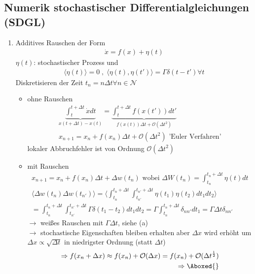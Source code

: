 \documentclass[12pt]{article}
\begin{document}
\subsection*{Numerik stochastischer Differentialgleichungen (SDGL)}
\begin{enumerate}
\item Additives Rauschen der Form 
\begin{align}
\dot{x}	= f(x) + \eta (t)
\end{align}
$\eta (t)$: stochastischer Prozess und
\begin{align}
\langle \eta (t) \rangle = 0 \; , \; \langle \eta (t), \eta (t') \rangle = \Gamma \delta (t-t') \forall t
\end{align}
Diskretisieren der Zeit $t_n = n \Delta t \forall n \in \mathcal{N}$
\begin{itemize}
\item ohne Rauschen 
\begin{align}
\underbrace{\int_t^{t+\Delta t} \dot{x} dt}_\text{$x(t+ \Delta t) - x(t)$} = \underbrace{\int_t ^{t+\Delta t} f(x(t')) dt'}_\text{$f(x(t)) \Delta t + \mathcal{O}(\Delta t^2)$} \\
x_{n+1} = x_n + f(x_n) \Delta t + \mathcal{O} (\Delta t^2) \mbox{ 'Euler Verfahren'}
\end{align}
lokaler Abbruchfehler ist von Ordnung $\mathcal{O} (\Delta t^2)$
\item mit Rauschen 
\begin{align}
x_{n+1} = x_n + f(x_n) \Delta t + \Delta w(t_n) \mbox{ wobei } \Delta W(t_n) = \int_{t_n}^{t_n + \Delta t} \eta (t) dt \\
\langle \Delta w(t_n) \Delta w(t_{n'}) \rangle = \langle \int_{t_n}^{t_n +\Delta t } \int_{t_{n'}}^{t_{n'} +\Delta t } \eta (t_1) \eta (t_2) dt_1 dt_2 \rangle \\
= \int_{t_n}^{t_n +\Delta t } \int_{t_{n'}}^{t_{n'} +\Delta t }  \Gamma \delta (t_1 - t_2) dt_1 dt_2 = \Gamma \int_{t_n}^{t_n +\Delta t } \delta_{n n'} dt_1 = \Gamma \Delta t \delta_{n n'}
\end{align}
$\to$ weißes Rauschen mit $\Gamma \Delta t$, siehe (a)\\
$\to$ stochastische Eigenschaften bleiben erhalten aber $\Delta x$ wird erhöht um $ \Delta x \propto \sqrt{\Delta t}$ in niedrigster Ordnung (statt $\Delta t$)
\begin{align}
\Rightarrow f(x_n + \Delta x) \approx f(x_n) + \mathcal{O} (\Delta x) = f(x_n) + \mathcal{O}(\Delta t^\frac{1}{2}) \\
\Rightarrow  \Aboxed{
}
\end{align}
\end{itemize}
\end{enumerate}
\end{document}
